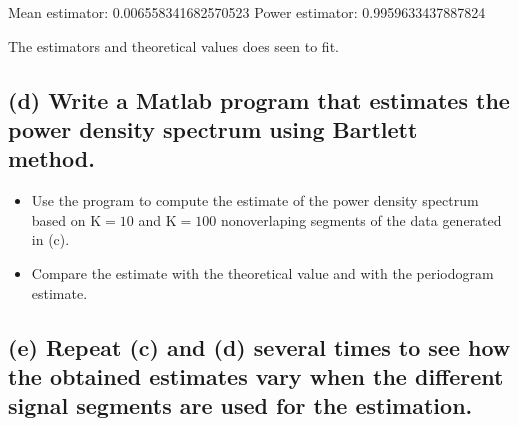 Mean estimator:  0.006558341682570523
Power estimator: 0.9959633437887824

The estimators and theoretical values does seen to fit.
\subsection*{(d) Write a Matlab program that estimates the power density spectrum using Bartlett method.}
\begin{itemize}
    \item Use the program to compute the estimate of the power density spectrum based on $\mathrm{K}=10$ and $\mathrm{K}=100$ nonoverlaping segments of the data generated in (c).
    \item Compare the estimate with the theoretical value and with the periodogram estimate.
\end{itemize}



\subsection*{(e) Repeat (c) and (d) several times to see how the obtained estimates vary when the different signal segments are used for the estimation.}

